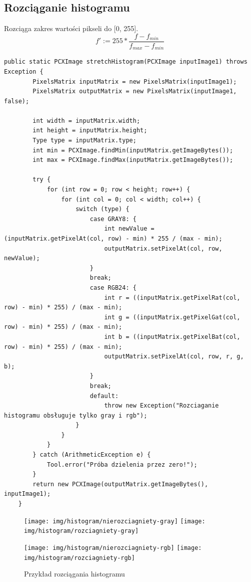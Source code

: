 \documentclass{article}
\begin{document}
	\subsection{Rozciąganie histogramu}
	Rozciąga zakres wartości pikseli do [0, 255]. 
	\begin{equation*}
	f':=255*\frac{f-f_{min}}{f_{max}-f_{min}}
	\end{equation*}
	\begin{verbatim}
public static PCXImage stretchHistogram(PCXImage inputImage1) throws Exception {
        PixelsMatrix inputMatrix = new PixelsMatrix(inputImage1);
        PixelsMatrix outputMatrix = new PixelsMatrix(inputImage1, false);
        
        int width = inputMatrix.width;
        int height = inputMatrix.height;
        Type type = inputMatrix.type;
        int min = PCXImage.findMin(inputMatrix.getImageBytes());
        int max = PCXImage.findMax(inputMatrix.getImageBytes());

        try {
            for (int row = 0; row < height; row++) {
                for (int col = 0; col < width; col++) {
                    switch (type) {
                        case GRAY8: {
                            int newValue = (inputMatrix.getPixelAt(col, row) - min) * 255 / (max - min);
                            outputMatrix.setPixelAt(col, row, newValue);
                        }
                        break;
                        case RGB24: {
                            int r = ((inputMatrix.getPixelRat(col, row) - min) * 255) / (max - min);
                            int g = ((inputMatrix.getPixelGat(col, row) - min) * 255) / (max - min);
                            int b = ((inputMatrix.getPixelBat(col, row) - min) * 255) / (max - min);
                            outputMatrix.setPixelAt(col, row, r, g, b);
                        }
                        break;
                        default:
                            throw new Exception("Rozciaganie histogramu obsługuje tylko gray i rgb");
                    }
                }
            }
        } catch (ArithmeticException e) {
            Tool.error("Próba dzielenia przez zero!");
        }
        return new PCXImage(outputMatrix.getImageBytes(), inputImage1);
    }

	\end{verbatim}
	
	\begin{figure}[!ht]	
	\centering	
	\texttt{[image: img/histogram/nierozciagniety-gray]}
	\texttt{[image: img/histogram/rozciagniety-gray]}
	
  \texttt{[image: img/histogram/nierozciagniety-rgb]}
	\texttt{[image: img/histogram/rozciagniety-rgb]}
	\caption{Przykład rozciągania histogramu}
	\label{fig16}	
	\end{figure}	
\end{document}
